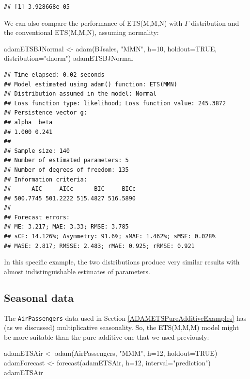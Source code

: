 \documentclass[
]{book}
\newenvironment{Shaded}{\begin{snugshade}}{\end{snugshade}}
\newcommand{\AttributeTok}[1]{\textcolor[rgb]{0.77,0.63,0.00}{#1}}
\newcommand{\ConstantTok}[1]{\textcolor[rgb]{0.00,0.00,0.00}{#1}}
\newcommand{\DecValTok}[1]{\textcolor[rgb]{0.00,0.00,0.81}{#1}}
\newcommand{\FunctionTok}[1]{\textcolor[rgb]{0.00,0.00,0.00}{#1}}
\newcommand{\NormalTok}[1]{#1}
\newcommand{\OtherTok}[1]{\textcolor[rgb]{0.56,0.35,0.01}{#1}}
\newcommand{\StringTok}[1]{\textcolor[rgb]{0.31,0.60,0.02}{#1}}
\theoremstyle{definition}
\theoremstyle{definition}
\theoremstyle{definition}
\theoremstyle{definition}
\theoremstyle{remark}
\begin{document}
\begin{verbatim}
## [1] 3.928668e-05
\end{verbatim}

We can also compare the performance of ETS(M,M,N) with \(\Gamma\) distribution and the conventional ETS(M,M,N), assuming normality:

\begin{Shaded}
\begin{Highlighting}[]
\NormalTok{adamETSBJNormal }\OtherTok{\textless{}{-}} \FunctionTok{adam}\NormalTok{(BJsales, }\StringTok{"MMN"}\NormalTok{, }\AttributeTok{h=}\DecValTok{10}\NormalTok{, }\AttributeTok{holdout=}\ConstantTok{TRUE}\NormalTok{,}
                        \AttributeTok{distribution=}\StringTok{"dnorm"}\NormalTok{)}
\NormalTok{adamETSBJNormal}
\end{Highlighting}
\end{Shaded}

\begin{verbatim}
## Time elapsed: 0.02 seconds
## Model estimated using adam() function: ETS(MMN)
## Distribution assumed in the model: Normal
## Loss function type: likelihood; Loss function value: 245.3872
## Persistence vector g:
## alpha  beta 
## 1.000 0.241 
## 
## Sample size: 140
## Number of estimated parameters: 5
## Number of degrees of freedom: 135
## Information criteria:
##      AIC     AICc      BIC     BICc 
## 500.7745 501.2222 515.4827 516.5890 
## 
## Forecast errors:
## ME: 3.217; MAE: 3.33; RMSE: 3.785
## sCE: 14.126%; Asymmetry: 91.6%; sMAE: 1.462%; sMSE: 0.028%
## MASE: 2.817; RMSSE: 2.483; rMAE: 0.925; rRMSE: 0.921
\end{verbatim}

In this specific example, the two distributions produce very similar results with almost indistinguishable estimates of parameters.

\hypertarget{seasonal-data}{%
\subsection{Seasonal data}\label{seasonal-data}}

The \texttt{AirPassengers} data used in Section \ref{ADAMETSPureAdditiveExamples} has (as we discussed) multiplicative seasonality. So, the ETS(M,M,M) model might be more suitable than the pure additive one that we used previously:

\begin{Shaded}
\begin{Highlighting}[]
\NormalTok{adamETSAir }\OtherTok{\textless{}{-}} \FunctionTok{adam}\NormalTok{(AirPassengers, }\StringTok{"MMM"}\NormalTok{, }\AttributeTok{h=}\DecValTok{12}\NormalTok{, }\AttributeTok{holdout=}\ConstantTok{TRUE}\NormalTok{)}
\NormalTok{adamForecast }\OtherTok{\textless{}{-}} \FunctionTok{forecast}\NormalTok{(adamETSAir, }\AttributeTok{h=}\DecValTok{12}\NormalTok{, }\AttributeTok{interval=}\StringTok{"prediction"}\NormalTok{)}
\NormalTok{adamETSAir}
\end{Highlighting}
\end{Shaded}
\end{document}
